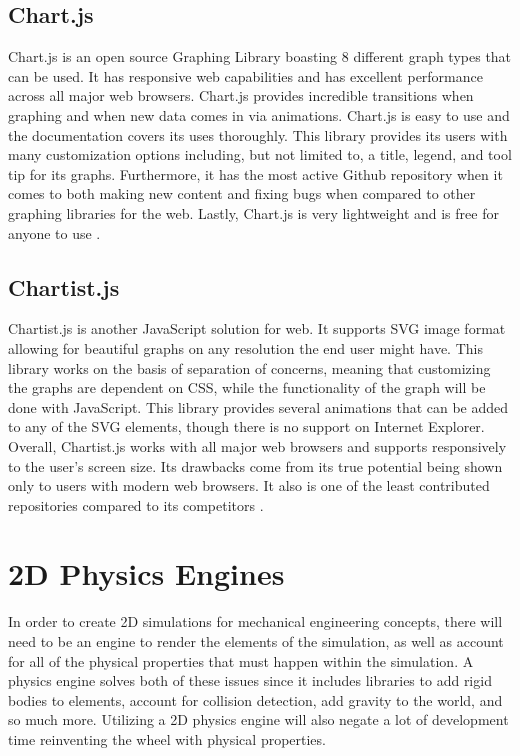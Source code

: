 \documentclass[capstone.tex]{subfiles}
\begin{document}
\subsection{Chart.js}

Chart.js is an open source Graphing Library boasting 8 different graph types that can be used. It has responsive web capabilities and has excellent performance across all major web browsers. Chart.js provides incredible transitions when graphing and when new data comes in via animations. Chart.js is easy to use and the documentation covers its uses thoroughly. This library provides its users with many customization options including, but not limited to, a title, legend, and tool tip for its graphs. Furthermore, it has the most active Github repository when it comes to both making new content and fixing bugs when compared to other graphing libraries for the web. Lastly, Chart.js is very lightweight and is free for anyone to use \cite{Chart.js}.

\subsection{Chartist.js}

Chartist.js is another JavaScript solution for web. It supports SVG image format allowing for beautiful graphs on any resolution the end user might have. This library works on the basis of separation of concerns, meaning that customizing the graphs are dependent on CSS, while the functionality of the graph will be done with JavaScript. This library provides several animations that can be added to any of the SVG elements, though there is no support on Internet Explorer. Overall, Chartist.js works with all major web browsers and supports responsively to the user's screen size. Its drawbacks come from its true potential being shown only to users with modern web browsers. It also is one of the least contributed repositories compared to its competitors \cite{ComaparisonCharts}.  

\section{2D Physics Engines}

In order to create 2D simulations for mechanical engineering concepts, there will need to be an engine to render the elements of the simulation, as well as account for all of the physical properties that must happen within the simulation. A physics engine solves both of these issues since it includes libraries to add rigid bodies to elements, account for collision detection, add gravity to the world, and so much more. Utilizing a 2D physics engine will also negate a lot of development time reinventing the wheel with physical properties.
\end{document}
